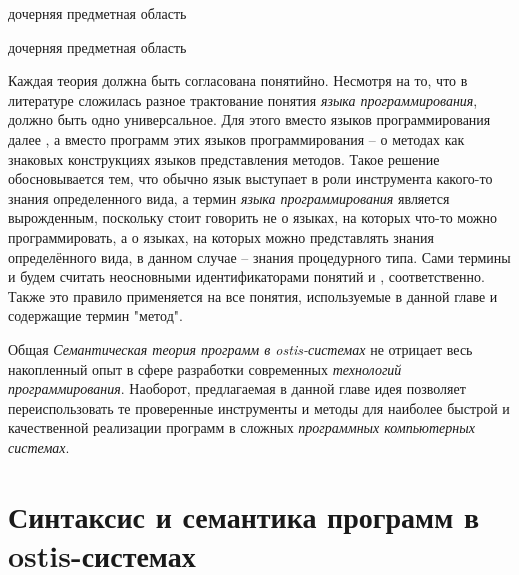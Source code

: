 \begin{SCn}
\begin{scnrelfromlist}{дочерняя предметная область}
    \begin{scnindent}
        \begin{scnrelfromlist}{дочерняя предметная область}
        \end{scnrelfromlist}
    \end{scnindent}
\end{scnrelfromlist}
\end{SCn}

Каждая теория должна быть согласована понятийно. Несмотря на то, что в литературе сложилась разное трактование понятия \textit{языка программирования}, должно быть одно универсальное. Для этого вместо языков программирования далее , а вместо программ этих языков программирования -- о методах как знаковых конструкциях языков представления методов. Такое решение обосновывается тем, что обычно язык выступает в роли инструмента какого-то знания определенного вида, а термин \textit{языка программирования} является вырожденным, поскольку стоит говорить не о языках, на которых что-то можно программировать, а о языках, на которых можно представлять знания определённого вида, в данном случае -- знания процедурного типа. Сами термины  и  будем считать неосновными идентификаторами понятий  и , соответственно. Также это правило применяется на все понятия, используемые в данной главе и содержащие термин "метод".

Общая \textit{Семантическая теория программ в ostis-системах} не отрицает весь накопленный опыт в сфере разработки современных \textit{технологий программирования}. Наоборот, предлагаемая в данной главе идея позволяет переиспользовать те проверенные инструменты и методы для наиболее быстрой и качественной реализации программ в сложных \textit{программных компьютерных системах}.

\section{Синтаксис и семантика программ в ostis-системах}
\label{sec_programs_method_syntax_and_semantic}

